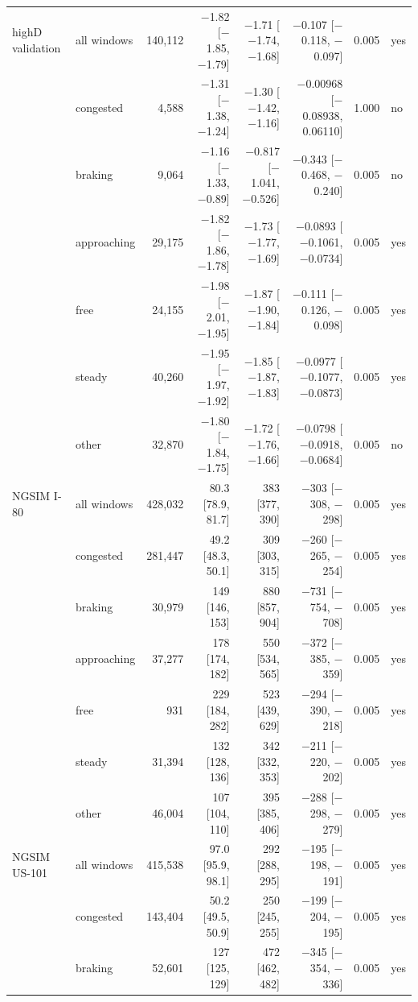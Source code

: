 \begin{longtable}{llrrrrrl}
\midrule
highD validation & all windows & 140,112 & $-$1.82 [$-$1.85, $-$1.79] & $-$1.71 [$-$1.74, $-$1.68] & $-$0.107 [$-$0.118, $-$0.097] & 0.005 & yes \\
 & congested & 4,588 & $-$1.31 [$-$1.38, $-$1.24] & $-$1.30 [$-$1.42, $-$1.16] & $-$0.00968 [$-$0.08938, 0.06110] & 1.000 & no \\
 & braking & 9,064 & $-$1.16 [$-$1.33, $-$0.89] & $-$0.817 [$-$1.041, $-$0.526] & $-$0.343 [$-$0.468, $-$0.240] & 0.005 & no \\
 & approaching & 29,175 & $-$1.82 [$-$1.86, $-$1.78] & $-$1.73 [$-$1.77, $-$1.69] & $-$0.0893 [$-$0.1061, $-$0.0734] & 0.005 & yes \\
 & free & 24,155 & $-$1.98 [$-$2.01, $-$1.95] & $-$1.87 [$-$1.90, $-$1.84] & $-$0.111 [$-$0.126, $-$0.098] & 0.005 & yes \\
 & steady & 40,260 & $-$1.95 [$-$1.97, $-$1.92] & $-$1.85 [$-$1.87, $-$1.83] & $-$0.0977 [$-$0.1077, $-$0.0873] & 0.005 & yes \\
 & other & 32,870 & $-$1.80 [$-$1.84, $-$1.75] & $-$1.72 [$-$1.76, $-$1.66] & $-$0.0798 [$-$0.0918, $-$0.0684] & 0.005 & no \\
\midrule
NGSIM I-80 & all windows & 428,032 & 80.3 [78.9, 81.7] & 383 [377, 390] & $-$303 [$-$308, $-$298] & 0.005 & yes \\
 & congested & 281,447 & 49.2 [48.3, 50.1] & 309 [303, 315] & $-$260 [$-$265, $-$254] & 0.005 & yes \\
 & braking & 30,979 & 149 [146, 153] & 880 [857, 904] & $-$731 [$-$754, $-$708] & 0.005 & yes \\
 & approaching & 37,277 & 178 [174, 182] & 550 [534, 565] & $-$372 [$-$385, $-$359] & 0.005 & yes \\
 & free & 931 & 229 [184, 282] & 523 [439, 629] & $-$294 [$-$390, $-$218] & 0.005 & yes \\
 & steady & 31,394 & 132 [128, 136] & 342 [332, 353] & $-$211 [$-$220, $-$202] & 0.005 & yes \\
 & other & 46,004 & 107 [104, 110] & 395 [385, 406] & $-$288 [$-$298, $-$279] & 0.005 & yes \\
\midrule
NGSIM US-101 & all windows & 415,538 & 97.0 [95.9, 98.1] & 292 [288, 295] & $-$195 [$-$198, $-$191] & 0.005 & yes \\
 & congested & 143,404 & 50.2 [49.5, 50.9] & 250 [245, 255] & $-$199 [$-$204, $-$195] & 0.005 & yes \\
 & braking & 52,601 & 127 [125, 129] & 472 [462, 482] & $-$345 [$-$354, $-$336] & 0.005 & yes \\

\end{longtable}
